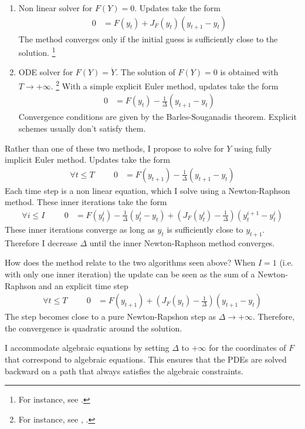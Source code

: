 \documentclass[english]{article}
\begin{document}
	\begin{enumerate}
		\item Non linear solver for $F (Y ) = 0$. Updates take the form
		\begin{align*}
			0 &= F(y_{t}) + J_{F}(y_t) (y_{t+1} - y_t)
		\end{align*}
		The method converges only if the initial guess is sufficiently close to the solution. \footnote{For instance, see \citet{campbell1999force}.}
		\item ODE solver for $F(Y) = \dot{Y}$. The solution of $F(Y)=0$ is obtained with $T\rightarrow +\infty$. \footnote{For instance, see \citet{ditellabalance}, \citet{silva2015risk}.}
		With a simple explicit Euler method, updates take the form
		\begin{align*}
			0&= F(y_t) - \frac{1}{\Delta} (y_{t+1} -y_{t})
		\end{align*}
		Convergence conditions are given by the Barles-Souganadis theorem. Explicit schemes usually don't satisfy them.
	\end{enumerate}
	Rather than one of these two methods, I propose to solve for $Y$ using fully implicit Euler method.  Updates take the form 
	\begin{align*}
		\forall t \leq T \hspace{1cm} 0&= F(y_{t+1}) - \frac{1}{\Delta}(y_{t+1} -y_{t})
	\end{align*}
	Each time step is a non linear equation, which I solve using a Newton-Raphson method. These inner iterations take the form
	\begin{align*}
		\forall i \leq I \hspace{1cm}	0 &= F(y_{t}^i) - \frac{1}{\Delta}(y_{t}^{i} -y_{t}) + (J_{F}(y_t^i) -  \frac{1}{\Delta})(y^{i+1}_{t} - y_t^i)
	\end{align*}
	These inner iterations converge as long as $y_t$ is sufficiently close to $y_{t+1}$. Therefore I decrease $\Delta$ until the inner Newton-Raphson method converges.\par
	How does the method relate to the two algorithms seen above? When $I =1$ (i.e. with only one inner iteration) the update can be seen as the sum of a Newton-Raphson and an explicit time step
	\begin{align*}
		\forall t \leq T \hspace{1cm} 0&= F(y_{t+1}) + (J_{F}(y_t) - \frac{1}{\Delta})(y_{t+1} -y_{t})
	\end{align*}
	The step becomes close to a pure Newton-Rapshon step as $\Delta \rightarrow + \infty$. Therefore, the convergence is quadratic around the solution. \par
	I accommodate algebraic equations by setting $\Delta$ to $+\infty$ for the coordinates  of $F$ that correspond to algebraic equations. This ensures that the PDEs are solved backward on a path that always satisfies the algebraic constraints.\par
\end{document}
